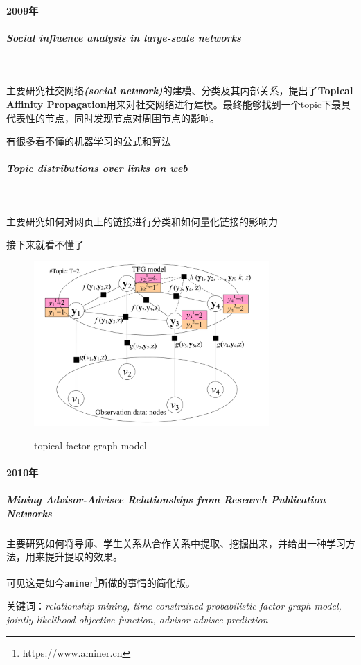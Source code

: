 \documentclass[UTF8]{ctexrep}
\begin{document}

\paragraph{2009年}
\subparagraph{Social influence analysis in large-scale networks}~\cite{tang2009social}
\par 主要研究社交网络\textbf{\textit{(social network)}}的建模、分类及其内部关系，提出了\textbf{Topical Affinity Propagation}用来对社交网络进行建模。最终能够找到一个topic下最具代表性的节点，同时发现节点对周围节点的影响。
\par 有很多看不懂的机器学习的公式和算法

\subparagraph{Topic distributions over links on web}~\cite{tang2009topic}
\par 主要研究如何对网页上的链接进行分类和如何量化链接的影响力
\par 接下来就看不懂了

\begin{figure}[h]
    \caption{topical factor graph model}
    \centering
    \includegraphics[width=0.8\textwidth]{assets/figures/model1.png}
    \label{fig:model1}
\end{figure}

\paragraph{2010年}
\subparagraph{Mining Advisor-Advisee Relationships from Research
Publication Networks}\cite{wang2010mining}
\par 主要研究如何将导师、学生关系从合作关系中提取、挖掘出来，并给出一种学习方法，用来提升提取的效果。

\par 可见这是如今\texttt{aminer}\footnote{https://www.aminer.cn}所做的事情的简化版。
\par {\heiti 关键词：}\emph{relationship mining, time-constrained probabilistic factor graph model, jointly likelihood objective function, advisor-advisee prediction}
\end{document}

